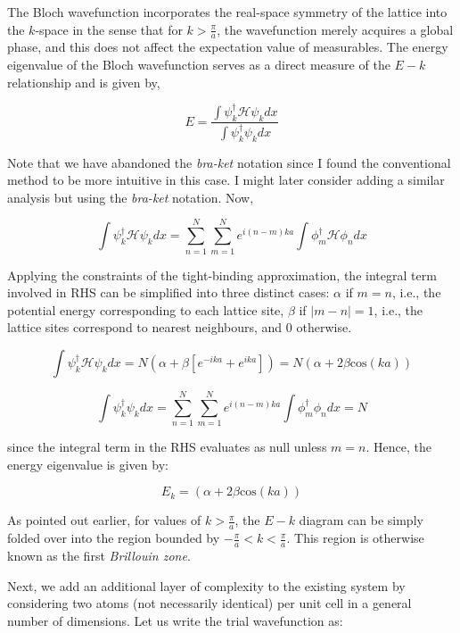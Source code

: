 \documentclass{resonance}
\begin{document}
The Bloch wavefunction incorporates the real-space symmetry of the lattice into the $k$-space in the sense that for $k > \frac{\pi}{a}$, the wavefunction merely acquires a global phase, and this does not affect the expectation value of measurables. The energy eigenvalue of the Bloch wavefunction serves as a direct measure of the $E-k$ relationship and is given by,

\begin{equation}
    E = \frac{\int \psi_{k}^{\dagger} \mathcal{H}\psi_{k} dx}{\int \psi_{k}^{\dagger} \psi_{k} dx}
\end{equation}

Note that we have abandoned the \textit{bra-ket} notation since I found the conventional method to be more intuitive in this case. I might later consider adding a similar analysis but using the \textit{bra-ket} notation. Now, 

\begin{equation}
    \int \psi_{k}^{\dagger}\mathcal{H}\psi_{k}dx = \sum_{n=1}^{N} \sum_{m=1}^{N}e^{i(n-m)ka} \int \phi_{m}^{\dagger}\mathcal{H}\phi_{n} dx
\end{equation}

Applying the constraints of the tight-binding approximation, the integral term involved in RHS can be simplified into three distinct cases: $\alpha$ if $m = n$, i.e., the potential energy corresponding to each lattice site, $\beta$ if $|m-n| =1$, i.e., the lattice sites correspond to nearest neighbours, and $0$ otherwise. 

\begin{equation}
    \int \psi_{k}^{\dagger}\mathcal{H}\psi_{k}dx = N(\alpha + \beta[e^{-ika}+e^{ika}]) = N(\alpha + 2\beta \text{cos}(ka))
\end{equation}

\begin{equation}
    \int \psi_{k}^{\dagger}\psi_{k}dx = \sum_{n=1}^{N} \sum_{m=1}^{N}e^{i(n-m)ka} \int \phi_{m}^{\dagger}\phi_{n} dx = N
\end{equation}

since the integral term in the RHS evaluates as null unless $m = n$. Hence, the energy eigenvalue is given by:

\begin{equation}
    E_{k} = (\alpha + 2\beta \text{cos}(ka))
\end{equation}

As pointed out earlier, for values of $k > \frac{\pi}{a}$, the $E-k$ diagram can be simply folded over into the region bounded by $-\frac{\pi}{a} < k < \frac{\pi}{a}$. This region is otherwise known as the first \textit{Brillouin zone}. \par
Next, we add an additional layer of complexity to the existing system by considering two atoms (not necessarily identical) per unit cell in a general number of dimensions. Let us write the trial wavefunction as:
\end{document}
